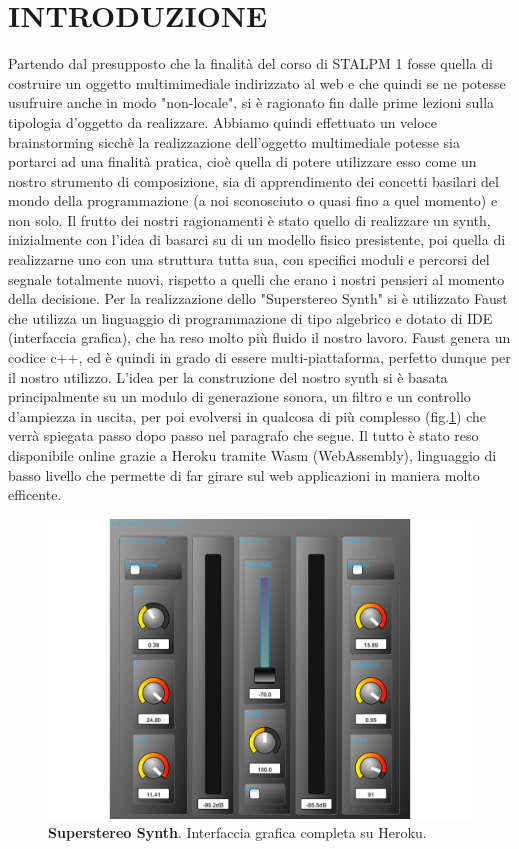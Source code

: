 \documentclass[
	a4paper,
	twocolumn
	]{article}
\begin{document}
\maketitle
\thispagestyle{empty}
\section*{INTRODUZIONE}
Partendo dal presupposto che la finalità del corso di STALPM 1 fosse quella
di costruire un oggetto multimimediale indirizzato al web e che quindi se ne
potesse usufruire anche in modo "non-locale", si è ragionato fin dalle prime
lezioni sulla tipologia d'oggetto da realizzare. Abbiamo quindi effettuato
un veloce brainstorming sicchè la realizzazione dell'oggetto multimediale
potesse sia portarci ad una finalità pratica, cioè quella di potere utilizzare
esso come un nostro strumento di composizione, sia di apprendimento dei concetti
basilari del mondo della programmazione (a noi sconosciuto o quasi fino a quel
momento) e non solo. Il frutto dei nostri ragionamenti è stato quello di realizzare un synth,
inizialmente con l'idea di basarci su di un modello fisico presistente, poi quella di
realizzarne uno con una struttura tutta sua, con specifici moduli e percorsi del segnale
totalmente nuovi, rispetto a quelli che erano i nostri pensieri al momento della decisione.
Per la realizzazione dello "Superstereo Synth" si è utilizzato Faust \cite{faust}
che utilizza un linguaggio di programmazione di tipo algebrico e dotato di IDE (interfaccia grafica), che
ha reso molto più fluido il nostro lavoro. Faust genera un codice c++, ed è quindi in grado
di essere multi-piattaforma, perfetto dunque per il nostro utilizzo. L'idea per
la construzione del nostro synth si è basata principalmente su un modulo di generazione sonora, un filtro e
un controllo d'ampiezza in uscita, per poi evolversi in qualcosa di più complesso (fig.\ref{superstereosynth}) che verrà spiegata passo dopo passo nel paragrafo che segue. Il tutto è stato reso disponibile online \cite{heroku} grazie
a Heroku tramite Wasm (WebAssembly), linguaggio di basso livello che permette di far girare sul web applicazioni in maniera molto efficente.

\begin{figure}[h]
\begin{center}
\includegraphics[width=.47\textwidth]{img/Superstereosynth}
\caption{\textbf{Superstereo Synth}. Interfaccia grafica completa su Heroku.}
\label{superstereosynth}
\end{center}
\end{figure}
\end{document}

